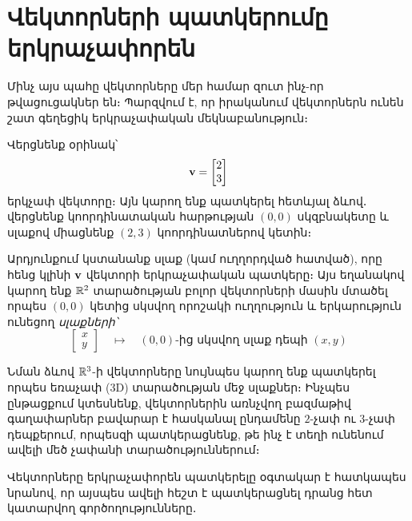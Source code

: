 

\section{Վեկտորների պատկերումը երկրաչափորեն}

Մինչ այս պահը վեկտորները մեր համար զուտ ինչ-որ թվացուցակներ են։ Պարզվում է, որ իրականում վեկտորներն ունեն շատ գեղեցիկ երկրաչափական մեկնաբանություն։ 

Վերցնենք օրինակ՝
\[
\mathbf{v}=\begin{bmatrix}2\\3    \end{bmatrix}
\]
երկչափ վեկտորը։ Այն կարող ենք պատկերել հետևյալ ձևով․ վերցնենք կոորդինատական հարթության $(0, 0)$ սկզբնակետը և սլաքով միացնենք $(2, 3)$ կոորդինատներով կետին։

\begin{center}
\end{center}

Արդյունքում կստանանք սլաք (կամ ուղղորդված հատված), որը հենց կլինի $\mathbf{v}$ վեկտորի երկրաչափական պատկերը։ Այս եղանակով կարող ենք $\mathbb{R}^2$ տարածության բոլոր վեկտորների մասին մտածել որպես $(0, 0)$ կետից սկսվող որոշակի ուղղություն և երկարություն ունեցող \textit{սլաքների՝}
\[
\begin{bmatrix}
    x \\ y
\end{bmatrix} \quad \mapsto \quad (0,0)\text{-ից սկսվող սլաք դեպի }(x, y)
\]

Նման ձևով $\mathbb{R}^3$-ի վեկտորները նույնպես կարող ենք պատկերել որպես եռաչափ ({\rm 3D}) տարածության մեջ սլաքներ։ Ինչպես ընթացքում կտեսնենք, վեկտորներին առնչվող բազմաթիվ գաղափարներ բավարար է հասկանալ ընդամենը $2$-չափ ու $3$-չափ դեպքերում, որպեսզի պատկե\-րաց\-նենք, թե ինչ է տեղի ունենում ավելի մեծ չափանի տարածու\-թյուն\-նե\-րում։

Վեկտորները երկրաչափորեն պատկերելը օգտակար է հատկապես նրանով, որ այսպես ավելի հեշտ է պատկերացնել դրանց հետ կատարվող գործողությունները․


